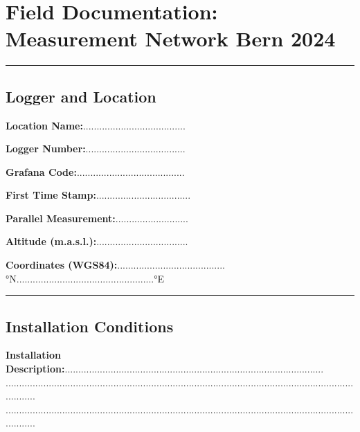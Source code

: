
\section*{Field Documentation: Measurement Network Bern 2024}
\vspace{-5mm}
\rule{\linewidth}{0.1mm}

\vspace{-5mm}
\subsection*{Logger and Location}

\begin{multicols}{2}
\textbf{Location Name:}......................................\hfill \newline

\textbf{Logger Number:}..................................... \hfill \newline

\textbf{Grafana Code:}........................................ \hfill \newline

\textbf{First Time Stamp:}...................................\hfill \newline

\textbf{Parallel Measurement:}...........................\hfill \newline

\textbf{Altitude (m.a.s.l.):}..................................\hfill \newline
\end{multicols}

\vspace{-4mm}
\textbf{Coordinates (WGS84):}........................................°N...................................................°E

\rule{\linewidth}{0.1mm}


\vspace{-5mm}
\subsection*{Installation Conditions}
\textbf{Installation Description:}................................................................................................\\
............................................................................................................................................\\
............................................................................................................................................

